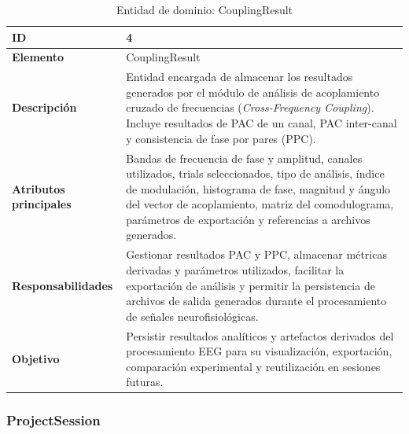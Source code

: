 \documentclass[12pt, letterpaper]{article}
\begin{document}
\begin{table}[H]
\centering

\begin{tabularx}{\textwidth}{|
>{}p{3.9cm}|
Y|
}

\hline
\textbf{ID} & 4 \\ \hline

\textbf{Elemento} & CouplingResult \\ \hline

\textbf{Descripción}
&
Entidad encargada de almacenar los resultados generados por el módulo de
análisis de acoplamiento cruzado de frecuencias
(\textit{Cross-Frequency Coupling}). Incluye resultados de PAC de un canal,
PAC inter-canal y consistencia de fase por pares (PPC).
\\ \hline

\textbf{Atributos principales}
&
Bandas de frecuencia de fase y amplitud, canales utilizados, trials
seleccionados, tipo de análisis, índice de modulación, histograma de fase,
magnitud y ángulo del vector de acoplamiento, matriz del comodulograma,
parámetros de exportación y referencias a archivos generados.
\\ \hline

\textbf{Responsabilidades}
&
Gestionar resultados PAC y PPC, almacenar métricas derivadas y parámetros
utilizados, facilitar la exportación de análisis y permitir la persistencia
de archivos de salida generados durante el procesamiento de señales
neurofisiológicas.
\\ \hline

\textbf{Objetivo}
&
Persistir resultados analíticos y artefactos derivados del procesamiento EEG
para su visualización, exportación, comparación experimental y reutilización
en sesiones futuras.
\\ \hline

\end{tabularx}

\caption{Entidad de dominio: CouplingResult}
\label{tab:couplingresult}

\end{table}

\subsubsection{ProjectSession}
\end{document}
